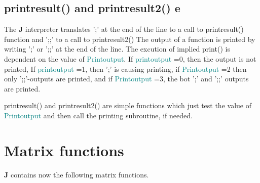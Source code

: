 \subsection{\textcolor{VioletRed}{printresult}() and \textcolor{VioletRed}{printresult2}() e}
\label{printresult}
The \textbf{J} interpreter translates ';'  at the end of the
line to a call to \textcolor{VioletRed}{printresult}() function and ';;' to a call to \textcolor{VioletRed}{printresult2}()
The output of a function is printed by writing ';' or ';;' at the end of the line. The excution of implied \textcolor{VioletRed}{print}()
is dependent on the value of \textcolor{teal}{Printoutput}. If \textcolor{teal}{printoutput} =0,
then the output is not printed, If \textcolor{teal}{printoutput} =1, then ';' is
causing printing, if \textcolor{teal}{Printoutput} =2 then only ';;'-outputs are
printed, and if \textcolor{teal}{Printoutput} =3, the bot ';' and ';;' outputs are printed.
\begin{note}
\textcolor{VioletRed}{printresult}() and \textcolor{VioletRed}{printresult2}() are  simple functions
which just test the value of
\textcolor{teal}{Printoutput} and then call the  printing subroutine, if needed.
\end{note}
\section{Matrix functions}
\label{matrixs}
\textbf{J} contains now the following matrix functions.
